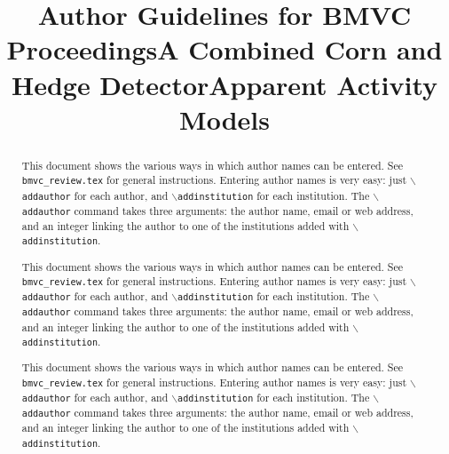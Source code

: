 \documentclass{bmvc2k}
\begin{document}
\def\cmd#1{$\backslash${\tt #1}}
\def\makeabstract{
\begin{abstract}
This document shows the various ways in which author names can be entered.
See {\tt bmvc\_review.tex} for general instructions.  Entering author names
is very easy: just \cmd{addauthor} for each author, and
\cmd{addinstitution} for each institution. The \cmd{addauthor} command
takes three arguments: the author name, email or web address, and an
integer linking the author to one of the institutions added with
\cmd{addinstitution}. 
\end{abstract}
}

\title{Author Guidelines for BMVC Proceedings}


\maketitle
\makeabstract

\bmvaResetAuthors
\title{A Combined Corn and Hedge Detector}

\maketitle
\makeabstract

\bmvaResetAuthors
\title{Apparent Activity Models}

\maketitle
\makeabstract
\end{document}
